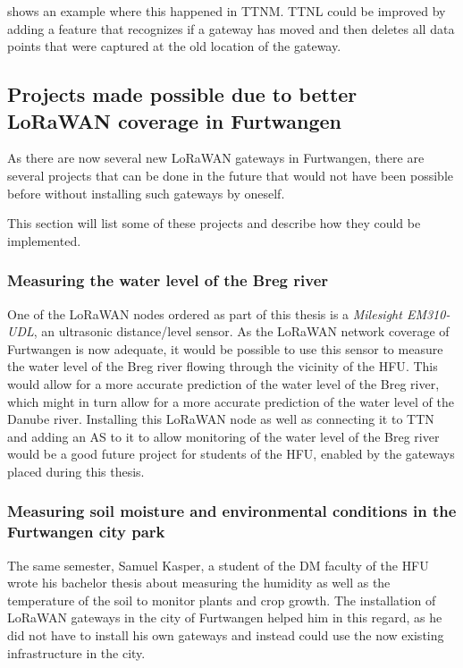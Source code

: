  shows an example where this happened in \ac{TTNM}.
\ac{TTNL} could be improved by adding a feature that recognizes if a gateway has moved and then deletes all data points that were captured at the old location of the gateway.

\subsection{Projects made possible due to better \acs{LoRaWAN} coverage in Furtwangen}

As there are now several new \ac{LoRaWAN} gateways in Furtwangen, there are several projects that can be done in the future that would not have been possible before without installing such gateways by oneself.

This section will list some of these projects and describe how they could be implemented.

\subsubsection{Measuring the water level of the Breg river}

One of the \ac{LoRaWAN} nodes ordered as part of this thesis is a \emph{Milesight EM310-UDL}, an ultrasonic distance/level sensor.
As the \ac{LoRaWAN} network coverage of Furtwangen is now adequate, it would be possible to use this sensor to measure the water level of the Breg river flowing through the vicinity of the \ac{HFU}.
This would allow for a more accurate prediction of the water level of the Breg river, which might in turn allow for a more accurate prediction of the water level of the Danube river.
Installing this \ac{LoRaWAN} node as well as connecting it to \ac{TTN} and adding an \acf{AS} to it to allow monitoring of the water level of the Breg river would be a good future project for students of the \ac{HFU}, enabled by the gateways placed during this thesis.

\subsubsection{Measuring soil moisture and environmental conditions in the Furtwangen city park}

The same semester, Samuel Kasper, a student of the \ac{DM} faculty of the \ac{HFU} wrote his bachelor thesis about measuring the humidity as well as the temperature of the soil to monitor plants and crop growth.
The installation of \ac{LoRaWAN} gateways in the city of Furtwangen helped him in this regard, as he did not have to install his own gateways and instead could use the now existing infrastructure in the city.

